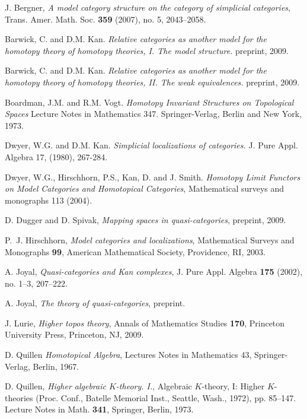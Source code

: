 \documentclass{amsart}
\begin{document}


\begin{thebibliography}{JTT}

 J. Bergner, {\em A model category structure on
the category of simplicial categories\/}, Trans. Amer. Math. Soc. {\bf
359} (2007), no. 5, 2043--2058.

 Barwick, C. and D.M. Kan. {\it Relative categories as another model for the homotopy theory of homotopy theories, I. The model structure.} preprint, 2009.

 Barwick, C. and D.M. Kan. {\it Relative categories as another model for the homotopy theory of homotopy theories, II. The weak equivalences.} preprint, 2009.

 Boardman, J.M. and R.M. Vogt. {\em Homotopy Invariant Structures on Topological Spaces\/} Lecture Notes in Mathematics 347. Springer-Verlag, Berlin and New York, 1973.

 Dwyer, W.G. and D.M. Kan. {\it Simplicial localizations
of categories.} J. Pure Appl. Algebra 17, (1980), 267-284.

 Dwyer, W.G., Hirschhorn, P.S., Kan, D. and J. Smith. {\em Homotopy Limit Functors on Model Categories and Homotopical Categories\/}, Mathematical surveys and monographs 113 (2004).

 D. Dugger and D. Spivak, {\em Mapping spaces in
quasi-categories\/}, preprint, 2009.

 P.~J. Hirschhorn, {\em Model categories and
localizations\/}, Mathematical Surveys and Monographs {\bf 99},
American Mathematical Society, Providence, RI, 2003.

 A. Joyal, {\em Quasi-categories and Kan complexes\/},
J. Pure Appl. Algebra {\bf 175} (2002), no. 1--3, 207--222.

 A. Joyal, {\em The theory of quasi-categories\/}, preprint.

 J. Lurie, {\em Higher topos theory\/}, Annals of
Mathematics Studies {\bf 170}, Princeton University Press, Princeton,
NJ, 2009.

 D. Quillen {\em Homotopical Algebra\/}, Lectures Notes in Mathematics 43, Springer-Verlag, Berlin, 1967. 

 D. Quillen, {\em Higher algebraic $K$-theory. I.\/},
Algebraic $K$-theory, I: Higher $K$-theories (Proc. Conf., Batelle
Memorial Inst., Seattle, Wash., 1972), pp. 85--147.  Lecture Notes in
Math. {\bf 341}, Springer, Berlin, 1973.    


\end{thebibliography}
\end{document}
